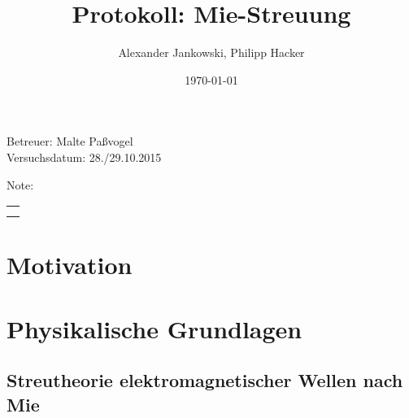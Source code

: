 \documentclass[numbers=noenddot,a4paper,notitlepage,twoside,BCOR15mm]{scrartcl}
\title{Protokoll: Mie-Streuung} %
\author{Alexander Jankowski, Philipp Hacker}
\date{\today}
\begin{document}
	\maketitle
	\begin{center}
		Betreuer: Malte Paßvogel\\ %
		Versuchsdatum: 28./29.10.2015\\ %
		\begin{table}[h]
			\centering
			Note: %
			\begin{tabularx}{1.5cm}{|X|}
				\hline \\ \\
				\hline
			\end{tabularx}
		\end{table}
	\end{center}
	\vspace*{\fill}
	\tableofcontents
	\vfill
	\newpage
	\section{Motivation}

	\newpage
	\section{Physikalische Grundlagen}

		\subsection{Streutheorie elektromagnetischer Wellen nach Mie}\label{subsec:miestreu}
\end{document}
